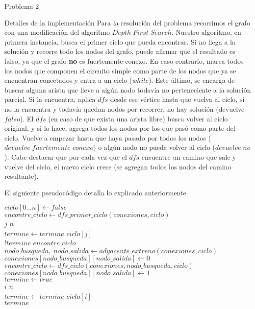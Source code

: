 \begin{section}{Problema 2}
\begin{subsection}{Detalles de la implementación}
		Para la resolución del problema recorrimos el grafo con una modificación del algoritmo $Depth\; First\; Search$. Nuestro algoritmo, en primera instancia, busca el primer ciclo que pueda encontrar. Si no llega a la solución y recorre todo los nodos del grafo, puede afirmar que el resultado es falso, ya que el grafo \textbf{no} es fuertemente conexo. En caso contrario, marca todos los nodos que componen el circuito simple como parte de los nodos que ya se encuentran conectados y entra a un ciclo ($while$). Este último, se encarga de buscar alguna arista que lleve a algún nodo todavía no perteneciente a la solución parcial. Si la encuentra, aplica $dfs$ desde ese vértice hasta que vuelva al ciclo, si no la encuentra y todavía quedan nodos por recorrer, no hay solución (devuelve $falso$). El $dfs$ (en caso de que exista una arista libre) busca volver al ciclo original, y si lo hace, agrega todos los nodos por los que pasó como parte del ciclo. Vuelve a empezar hasta que haya pasado por todos los nodos ($devuelve\; fuertemente\; conexo$) o algún nodo no puede volver al ciclo ($devuelve\; no$). Cabe destacar que por cada vez que el $dfs$ encuentre un camino que sale y vuelve del ciclo, el nuevo ciclo crece (se agregan todos los nodos del camino resultante).\VSP

		El siguiente pseudocódigo detalla lo explicado anteriormente.\VSP

		\begin{pseudo}
		\tab $ciclo[0...n] \leftarrow false$\\
		\tab $encontre\_ciclo \leftarrow dfs\_primer\_ciclo(conexiones,ciclo)$\\
		\tab \FOR $j$ \TO $n$\\
		\tab \tab $termine \leftarrow termine$ \AND $ciclo[j]$\\
		\tab \WHILE $!termine$ \AND $encontre\_ciclo$\\
		\tab \tab $nodo\_busqueda,\;nodo\_salida \leftarrow adyacente\_extreno(conexiones,ciclo)$\\
		\tab \tab $conexiones[nodo\_busqueda][nodo\_salida] \leftarrow 0$\\
		\tab \tab $encontre\_ciclo \leftarrow dfs\_ciclo(conexiones,nodo\_busqueda,ciclo)$\\
		\tab \tab $conexiones[nodo\_busqueda][nodo\_salida] \leftarrow 1$\\
		\tab \tab $termine \leftarrow true$\\
		\tab \tab \FOR $i$ \TO $n$\\
		\tab \tab \tab $termine \leftarrow termine$ \AND $ciclo[i]$\\
		\tab \RET $termine$\\
		\end{pseudo}


\end{subsection}
\end{section}
